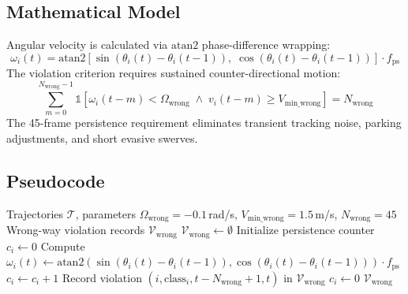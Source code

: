 \documentclass[12pt,a4paper]{report}
\begin{document}
\subsection{Mathematical Model}
Angular velocity is calculated via $\mathrm{atan2}$ phase-difference wrapping:
\begin{equation}
    \omega_i(t) = \mathrm{atan2}\!\left[\sin(\theta_i(t)-\theta_i(t{-}1)),\;\cos(\theta_i(t)-\theta_i(t{-}1))\right] \cdot f_{\text{ps}}
\end{equation}
The violation criterion requires sustained counter-directional motion:
\begin{equation}
    \sum_{m=0}^{N_{\text{wrong}}-1} \mathbb{1}\left[ \omega_i(t-m) < \Omega_{\text{wrong}} \;\land\; v_i(t-m) \ge V_{\text{min\_wrong}} \right] = N_{\text{wrong}}
\end{equation}
The 45-frame persistence requirement eliminates transient tracking noise, parking adjustments, and short evasive swerves.

\subsection{Pseudocode}
\begin{algorithm}[H]
\caption{Wrong-Way Driving Detection Algorithm}
\label{alg:rule3}
\begin{algorithmic}[1]
\Require Trajectories $\mathcal{T}$, parameters $\Omega_{\text{wrong}} = -0.1$\,rad/s, $V_{\text{min\_wrong}} = 1.5$\,m/s, $N_{\text{wrong}} = 45$
\Ensure Wrong-way violation records $\mathcal{V}_{\text{wrong}}$
\State $\mathcal{V}_{\text{wrong}} \gets \emptyset$
    \State Initialize persistence counter $c_i \gets 0$
        \State Compute $\omega_i(t) \gets \mathrm{atan2}(\sin(\theta_i(t)-\theta_i(t-1)), \cos(\theta_i(t)-\theta_i(t-1))) \cdot f_{\text{ps}}$
            \State $c_i \gets c_i + 1$
                \State Record violation $(i, \text{class}_i, t - N_{\text{wrong}} + 1, t)$ in $\mathcal{V}_{\text{wrong}}$
            \EndIf
        \Else
            \State $c_i \gets 0$
        \EndIf
    \EndFor
\EndFor
\State \Return $\mathcal{V}_{\text{wrong}}$
\end{algorithmic}
\end{algorithm}

\end{document}

